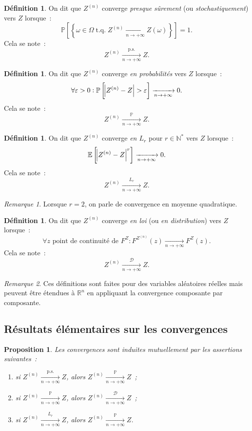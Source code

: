\documentclass{report}
\DeclareMathOperator{\tq}{\text{ t.q. }}
\renewcommand{\P}{\mathbb P}
\newcommand{\E}{\mathbb E}
\newcommand{\pinfty}{{+\infty}}
\newcommand{\cvgp}{\xrightarrow[n \to \pinfty]{\P}}
\newcommand{\cvgLr}{\xrightarrow[n \to \pinfty]{L_r}}
\newcommand{\cvgd}{\xrightarrow[n \to \pinfty]{\mathcal D}}
\newcommand{\ps}{{\text{p.s.}}}
\newcommand{\cvgps}{\xrightarrow[n \to \pinfty]\ps}
\newcommand{\N}{\mathbb N}
\newcommand{\R}{\mathbb R}
\newtheorem{prp}[thm]{Proposition}
\theoremstyle{definition}
\newtheorem{déf}[thm]{Définition}
\theoremstyle{remark}
\newtheorem*{rmq}{Remarque}
\begin{document}
			\begin{déf} On dit que $Z^{(n)}$ converge \textit{presque sûrement} (ou \textit{stochastiquement}) vers $Z$ lorsque~:
			\[\P\left[\left\{\omega \in \Omega \tq Z^{(n)} \xrightarrow[n \to \pinfty]{} Z(\omega)\right\}\right] = 1.\]
			Cela se note~:
			\[Z^{(n)} \cvgps Z.\]
			\end{déf}

			\begin{déf} On dit que $Z^{(n)}$ converge \textit{en probabilités} vers $Z$ lorsque~:
			\[\forall \varepsilon > 0 : \P\left[\abs {Z^{(n)} - Z} > \varepsilon\right] \xrightarrow[n \to \pinfty]{} 0.\]
			Cela se note~:
			\[Z^{(n)} \cvgp Z.\]
			\end{déf}

			\begin{déf} On dit que $Z^{(n)}$ converge \textit{en $L_r$} pour $r \in \N^*$ vers $Z$ lorsque~:
			\[\E\left[\abs {Z^{(n)} - Z}^r\right] \xrightarrow[n \to \pinfty]{} 0.\]
			Cela se note~:
			\[Z^{(n)} \cvgLr Z.\]
			\end{déf}

			\begin{rmq} Lorsque $r=2$, on parle de convergence en moyenne quadratique.
			\end{rmq}

			\begin{déf} On dit que $Z^{(n)}$ converge \textit{en loi} (ou \textit{en distribution}) vers $Z$ lorsque~:
			\[\forall z \text{ point de continuité de }F^Z : F^{Z^{(n)}}(z) \xrightarrow[n \to \pinfty]{} F^Z(z).\]
			Cela se note~:
			\[Z^{(n)} \cvgd Z.\]
			\end{déf}

			\begin{rmq} Ces définitions sont faites pour des variables aléatoires réelles mais peuvent être étendues à $\R^n$ en appliquant la convergence composante
			par composante.
			\end{rmq}

		\subsection{Résultats élémentaires sur les convergences}
			\begin{prp} Les convergences sont induites mutuellement par les assertions suivantes~:
			\begin{enumerate}
				\item si $Z^{(n)} \cvgps Z$, alors $Z^{(n)} \cvgp Z$~;
				\item si $Z^{(n)} \cvgp Z$, alors $Z^{(n)} \cvgd Z$~;
				\item si $Z^{(n)} \cvgLr Z$, alors $Z^{(n)} \cvgp Z$.
			\end{enumerate}
			\end{prp}
\end{document}
